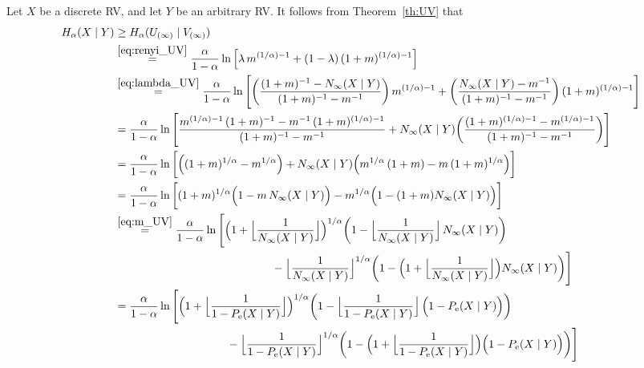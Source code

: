 \documentclass[conference, draftcls, onecolumn]{IEEEtran}
\theoremstyle{plain}
\newcommand{\thref}[1]{Theorem~\ref{#1}}
\newcommand{\corref}[1]{Corollary~\ref{#1}}
\begin{document}
\begin{IEEEproof}[Proof of \corref{cor:fano_renyi}]
Let $X$ be a discrete RV, and let $Y$ be an arbitrary RV.
It follows from \thref{th:UV} that
\begin{align}
H_{\alpha}(X \mid Y)
& \ge
H_{\alpha}(U_{(\infty)} \mid V_{(\infty)})
\\
& \overset{\eqref{eq:renyi_UV}}{=}
\frac{ \alpha }{ 1 - \alpha } \ln \Big[ \lambda \, m^{(1/\alpha)-1} + (1 - \lambda) \, (1+m)^{(1/\alpha)-1} \Big]
\\
& \overset{\eqref{eq:lambda_UV}}{=}
\frac{ \alpha }{ 1 - \alpha } \ln \Bigg[ \bigg( \frac{ (1+m)^{-1} - N_{\infty}(X \mid Y) }{ (1+m)^{-1} - m^{-1} } \bigg) \, m^{(1/\alpha)-1} + \bigg( \frac{ N_{\infty}(X \mid Y) - m^{-1} }{ (1+m)^{-1} - m^{-1} } \bigg) \, (1+m)^{(1/\alpha)-1} \Bigg]
\\
& =
\frac{ \alpha }{ 1 - \alpha } \ln \Bigg[ \frac{ m^{(1/\alpha)-1} \, (1+m)^{-1} - m^{-1} \, (1+m)^{(1/\alpha)-1} }{ (1+m)^{-1} - m^{-1} } + N_{\infty}(X \mid Y) \bigg( \frac{ (1+m)^{(1/\alpha)-1} - m^{(1/\alpha)-1} }{ (1+m)^{-1} - m^{-1} } \bigg) \Bigg]
\\
& =
\frac{ \alpha }{ 1 - \alpha } \ln \bigg[ \Big( (1+m)^{1/\alpha} - m^{1/\alpha} \Big) + N_{\infty}(X \mid Y) \Big( m^{1/\alpha} \, (1+m) - m \, (1+m)^{1/\alpha} \Big) \bigg]
\\
& =
\frac{ \alpha }{ 1 - \alpha } \ln \bigg[ (1+m)^{1/\alpha} \Big( 1 - m \, N_{\infty}(X \mid Y) \Big) - m^{1/\alpha} \Big( 1 - (1+m) N_{\infty}(X \mid Y) \Big) \bigg]
\\
& \overset{\eqref{eq:m_UV}}{=}
\frac{ \alpha }{ 1 - \alpha } \ln \Bigg[ \Big( 1 + \Big\lfloor \frac{ 1 }{ N_{\infty}(X \mid Y) } \Big\rfloor \Big)^{1/\alpha} \bigg( 1 - \Big\lfloor \frac{ 1 }{ N_{\infty}(X \mid Y) } \Big\rfloor \, N_{\infty}(X \mid Y) \bigg)
\notag \\
& \qquad \qquad \qquad \qquad \qquad \qquad \qquad
- \Big\lfloor \frac{ 1 }{ N_{\infty}(X \mid Y) } \Big\rfloor^{1/\alpha} \bigg( 1 - \Big( 1 + \Big\lfloor \frac{ 1 }{ N_{\infty}(X \mid Y) } \Big\rfloor \Big) N_{\infty}(X \mid Y) \bigg) \Bigg]
\\
& =
\frac{ \alpha }{ 1 - \alpha } \ln \Bigg[ \Big( 1 + \Big\lfloor \frac{ 1 }{ 1 - P_{\mathrm{e}}(X \mid Y) } \Big\rfloor \Big)^{1/\alpha} \bigg( 1 - \Big\lfloor \frac{ 1 }{ 1 - P_{\mathrm{e}}(X \mid Y) } \Big\rfloor \, \Big( 1 - P_{\mathrm{e}}(X \mid Y) \Big) \bigg)
\notag \\
& \qquad \qquad \qquad \qquad \qquad
- \Big\lfloor \frac{ 1 }{ 1 - P_{\mathrm{e}}(X \mid Y) } \Big\rfloor^{1/\alpha} \bigg( 1 - \Big( 1 + \Big\lfloor \frac{ 1 }{ 1 - P_{\mathrm{e}}(X \mid Y) } \Big\rfloor \Big) \Big( 1 - P_{\mathrm{e}}(X \mid Y) \Big) \bigg) \Bigg]

\end{align}
\end{IEEEproof}
\end{document}

